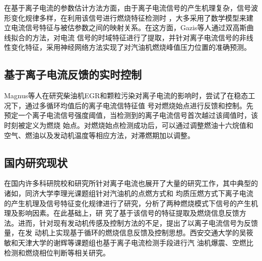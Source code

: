 在基于离子电流的参数估计方法方面，由于离子电流信号的产生机理复杂，信号波形变化规律多样，在利用该信号进行燃烧特征检测时
，大多采用了数学模型来建立电流信号特征与被估参数之间的映射关系。在这方面，Gazis等人\cite{panousakis2006ion}通过双高斯曲线拟合的方法，对电流
信号的时域特征进行了提取，并针对离子电流信号的非线性变化特征，采用神经网络方法实现了对汽油机燃烧峰值压力位置的准确预测。
\subsection{基于离子电流反馈的实时控制}
Magnus等人\cite{glavmo1999closed}在研究柴油机EGR和颗粒污染对离子电流的影响时，尝试了在稳态工况下，通过多循环均值后的离子电流信特征值
号对燃烧始点进行反馈和控制。先预定一个离子电流信号强度阈值，当检测到的离子电流信号首次越过该阈值时，该时刻被定义为燃烧
始点。对燃烧始点检测成功后，可以通过调整燃油十六烷值和空气、燃油以及发动机温度等相应方法，对滞燃期加以调整。
\subsection{国内研究现状}
在国内许多科研院校和研究所针对离子电流也展开了大量的研究工作，其中典型的诸如，同济大学李理光课题组针对汽油机的点燃方式和
均质压燃方式下离子电流的产生机理及信号特征变化规律进行了研究，分析了两种燃烧模式下信号的产生机理及影响因素。在此基础上，研
究了基于该信号的特征提取及燃烧信息反馈方法。进而，针对现有发动机传感及控制方法的不足，提出了以离子电流信号为反馈量，在发
动机上实现基于循环的燃烧信息反馈及控制思想。西安交通大学的吴筱敏\cite{gh2010}和天津大学的谢辉等课题组也基于离子电流检测手段进行汽
油机爆震、空燃比检测和燃烧相位判断等相关研究。
